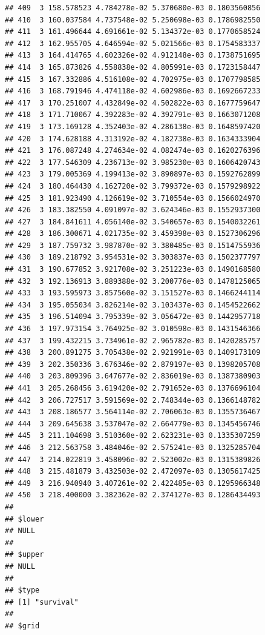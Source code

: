 \documentclass[article]{jss}\usepackage[]{graphicx}\usepackage[]{xcolor}
\makeatletter
\newenvironment{kframe}{%
 \def\at@end@of@kframe{}%
 \ifinner\ifhmode%
  \def\at@end@of@kframe{\end{minipage}}%
  \begin{minipage}{\columnwidth}%
 \fi\fi%
 \def\FrameCommand##1{\hskip\@totalleftmargin \hskip-\fboxsep
 \colorbox{shadecolor}{##1}\hskip-\fboxsep
     \hskip-\linewidth \hskip-\@totalleftmargin \hskip\columnwidth}%
 \MakeFramed {\advance\hsize-\width
   \@totalleftmargin\z@ \linewidth\hsize
   \@setminipage}}%
 {\par\unskip\endMakeFramed%
 \at@end@of@kframe}
\newenvironment{knitrout}{}{} %
\makeatother
\begin{document}
\begin{knitrout}
\begin{kframe}
\begin{verbatim}
## 409  3 158.578523 4.784278e-02 5.370680e-03 0.1803560856
## 410  3 160.037584 4.737548e-02 5.250698e-03 0.1786982550
## 411  3 161.496644 4.691661e-02 5.134372e-03 0.1770658524
## 412  3 162.955705 4.646594e-02 5.021566e-03 0.1754583337
## 413  3 164.414765 4.602326e-02 4.912148e-03 0.1738751695
## 414  3 165.873826 4.558838e-02 4.805991e-03 0.1723158447
## 415  3 167.332886 4.516108e-02 4.702975e-03 0.1707798585
## 416  3 168.791946 4.474118e-02 4.602986e-03 0.1692667233
## 417  3 170.251007 4.432849e-02 4.502822e-03 0.1677759647
## 418  3 171.710067 4.392283e-02 4.392791e-03 0.1663071208
## 419  3 173.169128 4.352403e-02 4.286138e-03 0.1648597420
## 420  3 174.628188 4.313192e-02 4.182738e-03 0.1634333904
## 421  3 176.087248 4.274634e-02 4.082474e-03 0.1620276396
## 422  3 177.546309 4.236713e-02 3.985230e-03 0.1606420743
## 423  3 179.005369 4.199413e-02 3.890897e-03 0.1592762899
## 424  3 180.464430 4.162720e-02 3.799372e-03 0.1579298922
## 425  3 181.923490 4.126619e-02 3.710554e-03 0.1566024970
## 426  3 183.382550 4.091097e-02 3.624346e-03 0.1552937300
## 427  3 184.841611 4.056140e-02 3.540657e-03 0.1540032261
## 428  3 186.300671 4.021735e-02 3.459398e-03 0.1527306296
## 429  3 187.759732 3.987870e-02 3.380485e-03 0.1514755936
## 430  3 189.218792 3.954531e-02 3.303837e-03 0.1502377797
## 431  3 190.677852 3.921708e-02 3.251223e-03 0.1490168580
## 432  3 192.136913 3.889388e-02 3.200776e-03 0.1478125065
## 433  3 193.595973 3.857560e-02 3.151527e-03 0.1466244114
## 434  3 195.055034 3.826214e-02 3.103437e-03 0.1454522662
## 435  3 196.514094 3.795339e-02 3.056472e-03 0.1442957718
## 436  3 197.973154 3.764925e-02 3.010598e-03 0.1431546366
## 437  3 199.432215 3.734961e-02 2.965782e-03 0.1420285757
## 438  3 200.891275 3.705438e-02 2.921991e-03 0.1409173109
## 439  3 202.350336 3.676346e-02 2.879197e-03 0.1398205708
## 440  3 203.809396 3.647677e-02 2.836019e-03 0.1387380903
## 441  3 205.268456 3.619420e-02 2.791652e-03 0.1376696104
## 442  3 206.727517 3.591569e-02 2.748344e-03 0.1366148782
## 443  3 208.186577 3.564114e-02 2.706063e-03 0.1355736467
## 444  3 209.645638 3.537047e-02 2.664779e-03 0.1345456746
## 445  3 211.104698 3.510360e-02 2.623231e-03 0.1335307259
## 446  3 212.563758 3.484046e-02 2.575241e-03 0.1325285704
## 447  3 214.022819 3.458096e-02 2.523002e-03 0.1315389826
## 448  3 215.481879 3.432503e-02 2.472097e-03 0.1305617425
## 449  3 216.940940 3.407261e-02 2.422485e-03 0.1295966348
## 450  3 218.400000 3.382362e-02 2.374127e-03 0.1286434493
## 
## $lower
## NULL
## 
## $upper
## NULL
## 
## $type
## [1] "survival"
## 
## $grid

\end{verbatim}
\end{kframe}
\end{knitrout}
\end{document}
